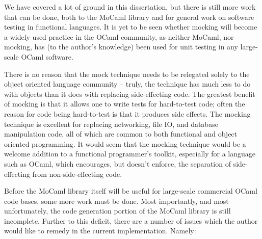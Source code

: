 
We have covered a lot of ground in this dissertation, but there is
still more work that can be done, both to the MoCaml library and for
general work on software testing in functional languages. It is yet to
be seen whether mocking will become a widely used practice in the
OCaml community, as neither MoCaml, nor mocking, has (to the author's
knowledge) been used for unit testing in any large-scale OCaml
software.

There is no reason that the mock technique needs to be relegated
solely to the object oriented language community -- truly, the
technique has much less to do with objects than it does with replacing
side-effecting code. The greatest benefit of mocking is that it allows
one to write tests for hard-to-test code; often the reason for code
being hard-to-test is that it produces side effects. The mocking
technique is excellent for replacing networking, file IO, and database
manipulation code, all of which are common to both functional and
object oriented programming. It would seem that the mocking technique
would be a welcome addition to a functional programmer's toolkit,
especially for a language such as OCaml, which encourages, but doesn't
enforce, the separation of side-effecting from non-side-effecting
code.

Before the MoCaml library itself will be useful for large-scale
commercial OCaml code bases, some more work must be done. Most
importantly, and most unfortunately, the code generation portion of
the MoCaml library is still incomplete. Further to this deficit, there
are a number of issues which the author would like to remedy in the
current implementation. Namely:

